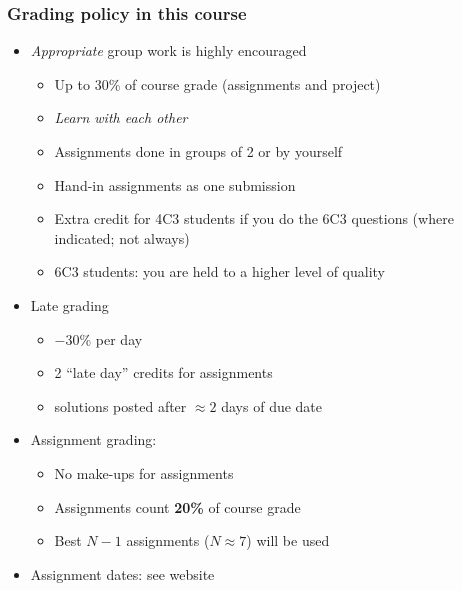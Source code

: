 \begin{frame}\frametitle{Grading policy in this course}
	\begin{itemize}
		\item	\emph{Appropriate} group work is highly encouraged
		\begin{itemize}
			\item	Up to 30\% of course grade (assignments and project)
			\item	\emph{Learn with each other}
			\item	Assignments done in groups of 2 or by yourself
			\item	Hand-in assignments as one submission
			\item	Extra credit for 4C3 students if you do the 6C3 questions (where indicated; not always)
			\item	6C3 students: you are held to a higher level of quality
		\end{itemize}
		\item	Late grading
		\begin{itemize}
			\item	\( -30 \)\% per day
			\item	2 ``late day'' credits for assignments
			\item	solutions posted after $\approx 2$ days of due date
		\end{itemize}
		\item	Assignment grading:
		\begin{itemize}
			\item	No make-ups for assignments
			\item	Assignments count {\color{myBlue}\textbf{20\%}} of course grade
			\item	Best $N-1$ assignments ($N \approx 7$) will be used
		\end{itemize}
		\item	Assignment dates: see website
	\end{itemize}
\end{frame}

